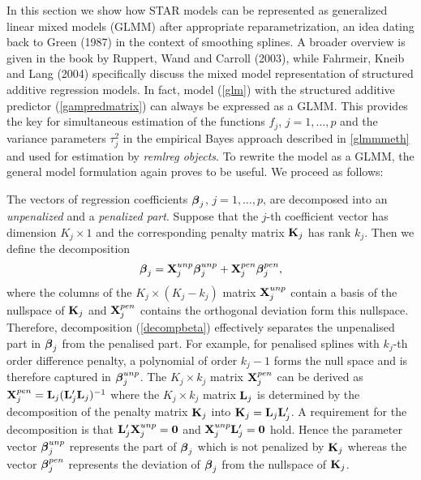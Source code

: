 \documentclass[11pt,a4paper,twoside]{bayesxarticle}
\begin{document}
In this section we show how STAR models can be represented as
generalized linear mixed models (GLMM) after appropriate
reparametrization, an idea dating back to Green (1987) in the
context of smoothing splines. A broader overview is given in the
book by Ruppert, Wand and Carroll (2003), while Fahrmeir, Kneib and
Lang (2004) specifically discuss the mixed model representation of
structured additive regression models. In fact, model (\ref{glm})
with the structured additive predictor (\ref{gampredmatrix}) can
always be expressed as a GLMM. This provides the key for
simultaneous estimation of the functions $f_j$, $j=1,\dots,p$ and
the variance parameters $\tau^2_j$ in the empirical Bayes approach
described in \autoref{glmmmeth} and used for estimation by {\em
remlreg objects}. To rewrite the model as a GLMM, the general model
formulation again proves to be useful. We proceed as follows:

The  vectors of regression coefficients $\boldsymbol{\beta}_j$, $j=1,\dots,p$,
are decomposed into an {\em unpenalized} and a {\em penalized part}.
Suppose that the $j$-th coefficient vector has dimension $K_j \times
1$ and the corresponding penalty matrix $\mathbf{K}_j$ has rank $k_j$. Then
we define the decomposition
\begin{equation}\label{decompbeta}
 \betavec_j = \Xvec_j^{unp} \betavec_j^{unp} + \Xvec_j^{pen}\betavec_j^{pen},
\end{equation}
where the columns of the $K_j \times (K_j - k_j)$ matrix
$\mathbf{X}_j^{unp}$ contain a basis of the nullspace of $\mathbf{K}_j$ and
$\mathbf{X}_j^{pen}$ contains the orthogonal deviation form this
nullspace. Therefore, decomposition (\ref{decompbeta}) effectively
separates the unpenalised part in $\boldsymbol{\beta}_j$ from the penalised
part. For example, for penalised splines with $k_j$-th order
difference penalty, a polynomial of order $k_j-1$ forms the null
space and is therefore captured in $\boldsymbol{\beta}_j^{unp}$. The  $K_j
\times k_j$ matrix $\mathbf{X}_j^{pen}$ can be derived as $\mathbf{X}_j^{pen}
= \mathbf{L}_j(\mathbf{L}_j'\mathbf{L}_j)^{-1}$ where the $K_j \times k_j$ matrix
$\mathbf{L}_j$ is determined by the decomposition of the penalty matrix
$\mathbf{K}_j$ into $\mathbf{K}_j = \mathbf{L}_j \mathbf{L}_j'$. A requirement for the
decomposition is that $\mathbf{L}_j' \mathbf{X}_j^{unp} = \boldsymbol{0}$ and
$\mathbf{X}_j^{unp} \mathbf{L}_j' = \boldsymbol{0}$ hold. Hence the parameter vector
$\boldsymbol{\beta}_j^{unp}$ represents the part of $\boldsymbol{\beta}_j$ which is not
penalized by $\mathbf{K}_j$ whereas the vector $\boldsymbol{\beta}_j^{pen}$
represents the deviation of $\boldsymbol{\beta}_j$ from the nullspace of
$\mathbf{K}_j$.
\end{document}
